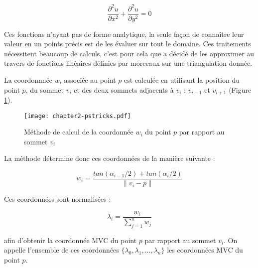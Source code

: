 \begin{equation}
  \frac{\partial^2 u}{\partial x^2} + \frac{\partial^2 u}{\partial y^2} = 0
\end{equation}

Ces fonctions n'ayant pas de forme analytique, la seule façon de connaître
leur valeur en un points précis est de les évaluer sur tout le domaine. Ces
traitements nécessitent beaucoup de calculs, c'est pour cela que \cite{Flo03}
a décidé de les approximer au travers de fonctions linéaires définies par
morceaux sur une triangulation donnée.

La coordonnnée $w_i$ associée au point $p$ est calculée en utilisant la
position du point $p$, du sommet $v_i$ et des deux sommets adjacents à $v_i$ :
$v_{i-1}$ et $v_{i+1}$ (Figure \ref{DEFcal}).

\begin{figure}[ht]
  \begin{center}
    \texttt{[image: chapter2-pstricks.pdf]}

    \caption[Méthode de calcul MVC] {Méthode de calcul de la coordonnée $w_i$
du point $p$ par rapport au sommet $v_i$}

    \label{DEFcal}   \end{center} \end{figure}

La méthode détermine donc ces coordonnées de la manière suivante :

\begin{equation}
  w_i = \frac{tan(\alpha_{i-1}/2) + tan(\alpha_i/2)}{\| v_i - p \|}
  \label{DEFcoo}
\end{equation}

Ces coordonnées sont normalisées :

\begin{equation}
  \lambda_i = \frac{w_i}{\sum_{j=1}^n w_j}
\end{equation}

afin d'obtenir la coordonnée MVC du point $p$ par rapport au sommet $v_i$. On
appelle l'ensemble de ces coordonnées $\{\lambda_0, \lambda_1, ...,
\lambda_n\}$ les coordonnées MVC du point $p$.



